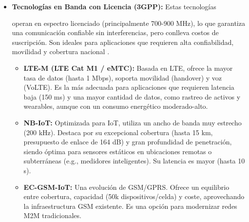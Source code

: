 \begin{itemize}
      \item \textbf{Tecnologías en Banda con Licencia (3GPP):} Estas tecnologías










            operan en espectro licenciado (principalmente 700-900 MHz),  lo  que
            garantiza  una  comunicación  confiable  sin  interferencias,   pero
            conlleva costos de suscripción. Son ideales  para  aplicaciones  que
            requieren  alta  confiabilidad,  movilidad  y   cobertura   nacional
            \parencite[]{chilamkurthy2022low}. \begin{itemize}
                  \item \textbf{LTE-M (LTE Cat M1 / eMTC):} Basada en LTE,
                        ofrece la mayor tasa de datos (hasta  1  Mbps),  soporta
                        movilidad (handover) y voz (VoLTE). Es la  más  adecuada
                        para aplicaciones que requieren latencia baja (150 ms) y
                        una mayor cantidad de datos, como rastreo de  activos  y
                        wearables,   aunque   con    un    consumo    energético
                        moderado-alto.
                  \item \textbf{NB-IoT:} Optimizada para IoT, utiliza un ancho
                        de  banda  muy  estrecho  (200  kHz).  Destaca  por   su
                        excepcional  cobertura  (hasta  15  km,  presupuesto  de
                        enlace de 164 dB) y  gran  profundidad  de  penetración,
                        siendo óptima para  sensores  estáticos  en  ubicaciones
                        remotas o subterráneas (e.g.,  medidores  inteligentes).
                        Su latencia es mayor (hasta 10 s).
                  \item \textbf{EC-GSM-IoT:} Una evolución de GSM/GPRS. Ofrece
                        un   equilibrio   entre   cobertura,   capacidad    (50k
                        dispositivos/celda)    y    coste,    aprovechando    la
                        infraestructura  GSM  existente.  Es  una  opción   para
                        modernizar redes M2M tradicionales.
            \end{itemize}


\end{itemize}
